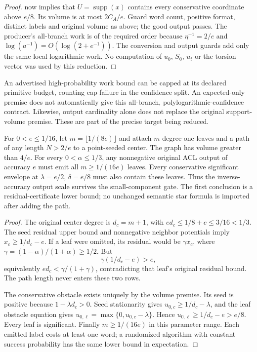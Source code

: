 \begin{proof}
 now implies that
$U=\operatorname{supp}(x)$ contains every conservative coordinate
above $e/8$. Its volume is at most $2C_A/e$. Guard word count, positive
format, distinct labels and original volume as above; the good output
passes. The producer's all-branch work is of the required order because
$\eta^{-1}=2/e$ and $\log(a^{-1})=O(\log(2+e^{-1}))$.
The conversion and output guards add only the same local logarithmic
work. No computation of $u_0$, $S_0$, $u_t$ or the torsion vector was
used by this reduction.
\end{proof}

An advertised high-probability work bound can be capped at its declared
primitive budget, counting cap failure in the confidence split. An
expected-only premise does not automatically give this all-branch,
polylogarithmic-confidence contract. Likewise, output cardinality alone
does not replace the original support-volume premise. These are part
of the precise target being reduced.

\begin{proposition}
\label{prop:op3-large-ambient-leaf-lower-bound}
For $0<e\leq1/16$, let $m=\lfloor1/(8e)\rfloor$ and attach $m$
degree-one leaves and a path of any length $N>2/e$ to a point-seeded
center. The graph has volume greater than $4/e$.
For every $0<\alpha\leq1/3$, any nonnegative original ACL output of
accuracy $e$ must emit all $m\geq1/(16e)$ leaves. Every conservative
significant envelope at $\lambda=e/2$, $\delta=e/8$ must also contain
these leaves. Thus the inverse-accuracy output scale survives the
small-component gate. The first conclusion is a residual-certificate
lower bound; no unchanged semantic star formula is imported after
adding the path.
\end{proposition}
\begin{proof}
The original center degree is $d_c=m+1$, with
$ed_c\leq1/8+e\leq3/16<1/3$. The seed residual upper bound and
nonnegative neighbor potentials imply $x_c\geq1/d_c-e$.
If a leaf were omitted, its residual would be $\gamma x_c$, where
$\gamma=(1-\alpha)/(1+\alpha)\geq1/2$. But
\[
 \gamma(1/d_c-e)>e,
\]
equivalently $ed_c<\gamma/(1+\gamma)$, contradicting that leaf's
original residual bound. The path length never enters these two rows.

The conservative obstacle exists uniquely by the volume premise.
Its seed is positive because $1-\lambda d_c>0$. Seed stationarity
gives $u_{0,c}\geq1/d_c-\lambda$, and the leaf obstacle equation gives
$u_{0,\ell}=\max\{0,u_{0,c}-\lambda\}$. Hence
$u_{0,\ell}\geq1/d_c-e>e/8$. Every leaf is significant.
Finally $m\geq1/(16e)$ in this parameter range. Each emitted label
costs at least one word; a randomized algorithm with constant success
probability has the same lower bound in expectation.
\end{proof}

